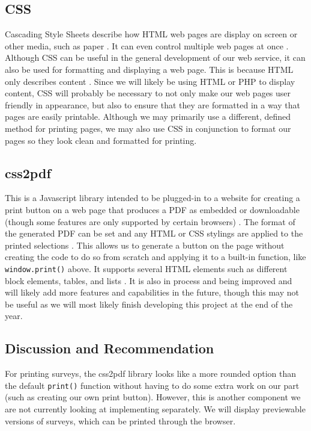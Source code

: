 \documentclass[letterpaper,10pt,serif, draftclsnofoot,onecolumn, compsoc, titlepage]{IEEEtran}
\begin{document}
\subsection{CSS} %
Cascading Style Sheets describe how HTML web pages are display on screen or other media, such as paper \cite{css}.
It can even control multiple web pages at once \cite{css}.
Although CSS can be useful in the general development of our web service, it can also be used for formatting and displaying a web page.
This is because HTML only describes content \cite{css}.
Since we will likely be using HTML or PHP to display content, CSS will probably be necessary to not only make our web pages user friendly in appearance, but also to ensure that they are formatted in a way that pages are easily printable.
Although we may primarily use a different, defined method for printing pages, we may also use CSS in conjunction to format our pages so they look clean and formatted for printing.
\subsection{css2pdf} %
This is a Javascript library intended to be plugged-in to a website for creating a print button on a web page that produces a PDF as embedded or downloadable (though some features are only supported by certain browsers) \cite{css2pdf}.
The format of the generated PDF can be set and any HTML or CSS stylings are applied to the printed selections \cite{css2pdf}.
This allows us to generate a button on the page without creating the code to do so from scratch and applying it to a built-in function, like \texttt{window.print()} above.
It supports several HTML elements such as different block elements, tables, and lists \cite{css2pdf_home}.
It is also in process and being improved and will likely add more features and capabilities in the future, though this may not be useful as we will most likely finish developing this project at the end of the year.
\subsection{Discussion and Recommendation}
For printing surveys, the css2pdf library looks like a more rounded option than the default \texttt{print()} function without having to do some extra work on our part (such as creating our own print button). 
However, this is another component we are not currently looking at implementing separately.
We will display previewable versions of surveys, which can be printed through the browser.
\end{document}
